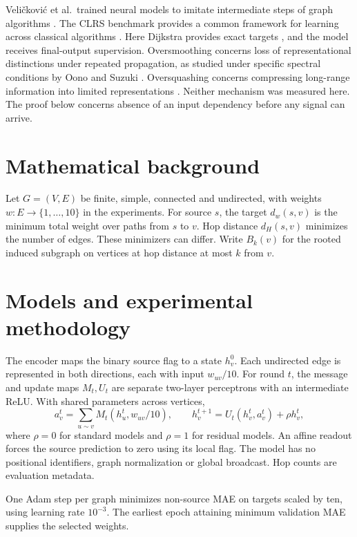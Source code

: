 \documentclass[11pt]{article}
\begin{document}
Veli\v{c}kovi\'c et al.\ trained neural models to imitate intermediate steps of graph algorithms \cite{execution}. The CLRS benchmark provides a common framework for learning across classical algorithms \cite{clrs}. Here Dijkstra provides exact targets \cite{dijkstra}, and the model receives final-output supervision. Oversmoothing concerns loss of representational distinctions under repeated propagation, as studied under specific spectral conditions by Oono and Suzuki \cite{oono}. Oversquashing concerns compressing long-range information into limited representations \cite{alon}. Neither mechanism was measured here. The proof below concerns absence of an input dependency before any signal can arrive.

\section{Mathematical background}
Let \(G=(V,E)\) be finite, simple, connected and undirected, with weights \(w:E\to\{1,\ldots,10\}\) in the experiments. For source \(s\), the target \(d_w(s,v)\) is the minimum total weight over paths from \(s\) to \(v\). Hop distance \(d_H(s,v)\) minimizes the number of edges. These minimizers can differ. Write \(B_k(v)\) for the rooted induced subgraph on vertices at hop distance at most \(k\) from \(v\).

\section{Models and experimental methodology}
The encoder maps the binary source flag to a state \(h_v^0\). Each undirected edge is represented in both directions, each with input \(w_{uv}/10\). For round \(t\), the message and update maps \(M_t,U_t\) are separate two-layer perceptrons with an intermediate ReLU. With shared parameters across vertices,
\[
a_v^t=\sum_{u\sim v}M_t(h_u^t,w_{uv}/10),\qquad
h_v^{t+1}=U_t(h_v^t,a_v^t)+\rho h_v^t ,
\]
where \(\rho=0\) for standard models and \(\rho=1\) for residual models. An affine readout forces the source prediction to zero using its local flag. The model has no positional identifiers, graph normalization or global broadcast. Hop counts are evaluation metadata.

One Adam step per graph minimizes non-source MAE on targets scaled by ten, using learning rate \(10^{-3}\). The earliest epoch attaining minimum validation MAE supplies the selected weights.
\end{document}
